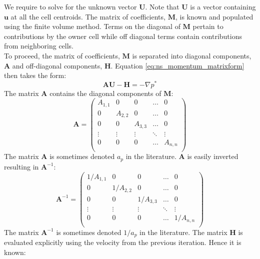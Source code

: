 \documentclass[a4paper,11pt]{report}
\begin{document}
We require to solve for the unknown vector $\mathbf{U}$. Note that $\mathbf{U}$ is a vector containing $\mathbf{u}$ at all the cell centroids. The matrix of coefficients, $\mathbf{M}$, is known and populated using the finite volume method. Terms on the diagonal of $\mathbf{M}$ pertain to contributions by the owner cell while off diagonal terms contain contributions from neighboring cells.
\vspace{5mm}\\
To proceed, the matrix of coefficients, $\mathbf{M}$ is separated into diagonal components, $\mathbf{A}$ and off-diagonal components, $\mathbf{H}$. Equation \ref{eq:ns_momentum_matrixform} then takes the form:
\begin{equation}
    \mathbf{A}\mathbf{U} - \mathbf{H} = - \nabla{p^*}
    \label{eq:ns_momentum_matrixform_split}
\end{equation}
The matrix $\mathbf{A}$ contains the diagonal components of $\mathbf{M}$:
\begin{equation}
    \mathbf{A} =
    \begin{pmatrix}
        A_{1,1} & 0 & 0 & \dots & 0\\
        0 & A_{2,2} & 0 & \dots & 0\\
        0 & 0 & A_{3,3} & \dots & 0\\
        \vdots  & \vdots  & \vdots  & \ddots & \vdots\\
        0 & 0 & 0 & \dots & A_{n,n}\\
    \end{pmatrix}
    \label{eq:a_matrix}
\end{equation}
The matrix $\mathbf{A}$ is sometimes denoted $a_p$ in the literature. $\mathbf{A}$ is easily inverted resulting in $\mathbf{A}^{-1}$:
\begin{equation}
    \mathbf{A}^{-1} =
    \begin{pmatrix}
        1/A_{1,1} & 0 & 0 & \dots & 0\\
        0 & 1/A_{2,2} & 0 & \dots & 0\\
        0 & 0 & 1/A_{3,3} & \dots & 0\\
        \vdots  & \vdots  & \vdots  & \ddots & \vdots\\
        0 & 0 & 0 & \dots & 1/A_{n,n}\\
    \end{pmatrix}
    \label{eq:a_inv_matrix}
\end{equation}
The matrix $\mathbf{A}^{-1}$ is sometimes denoted $1/a_p$ in the literature. The matrix $\mathbf{H}$ is evaluated explicitly using the velocity from the previous iteration. Hence it is known:
\end{document}
